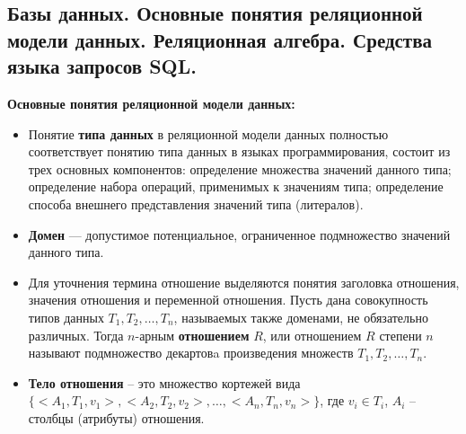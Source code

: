 \subsection{Базы данных. Основные понятия реляционной модели данных. Реляционная алгебра. Средства языка запросов SQL.}


\textbf{Основные понятия реляционной модели данных:}

\begin{itemize}
    \item Понятие \textbf{типа данных} в реляционной модели данных полностью соответствует понятию типа данных в языках программирования, состоит из трех основных компонентов: определение множества значений данного типа; определение набора операций, применимых к значениям типа; определение способа внешнего представления значений типа (литералов).
    \item \textbf{Домен} --- допустимое потенциальное, ограниченное подмножество значений данного типа.
    \item Для уточнения термина отношение выделяются понятия заголовка отношения, значения отношения и переменной отношения.
    Пусть дана совокупность типов данных $T_1, T_2, \dots, T_n$, называемых также доменами, не обязательно различных. Тогда $n$-арным \textbf{отношением} $R$, или отношением $R$ степени $n$ называют подмножество декартовa произведения множеств $T_1, T_2, \dots, T_n$.
    \item \textbf{Тело отношения} -- это множество кортежей вида $\{<A_1, T_1, v_1>, < A_2, T_2, v_2 >,\dots, < A_n, T_n, v_n>\}$, где $v_i \in T_i$, $A_i$ -- столбцы (атрибуты) отношения. 

\end{itemize}


